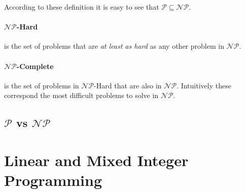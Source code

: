 According to these definition it is easy to see that $\mathcal{P} \subseteq
	\mathcal{NP} $.

\paragraph{$\mathcal{NP} $-Hard}%
\label{par:_np_hard} is the set of problems that are \emph{at least as hard} as
any other problem in $\mathcal{NP} $.

\paragraph{$\mathcal{NP} $-Complete}%
\label{par:_np_hard} is the set of problems in $\mathcal{NP} $-Hard that are
also in $\mathcal{NP} $. Intuitively these correspond the most difficult
problems to solve in $\mathcal{NP} $.

\subsection{$\mathcal{P} $ vs $\mathcal{NP}$}%
\label{sub:_p_vs_np_}


\section{Linear and Mixed Integer Programming}%
\label{sec:linear_and_mixed_integer_programming}
